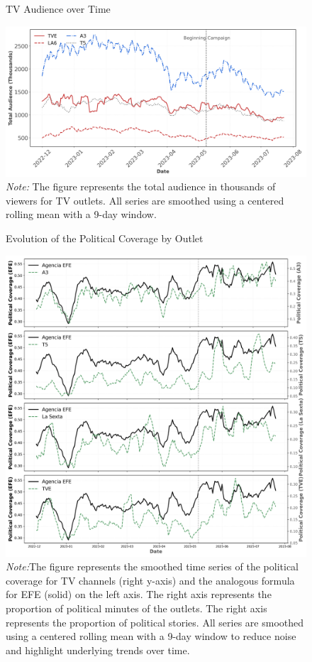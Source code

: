 \documentclass[12pt]{article}
\begin{document}
	
	
	
	\begin{figure}[!htb]
		\caption{TV Audience over Time}
		\centering
		\includegraphics[width=150mm]{figures/tv_audience_total}
		\caption*{\small \textit{Note:} The figure represents the total audience in thousands of viewers for TV outlets. All series are smoothed using a centered rolling mean with a 9-day window.}
		\label{fig:audience_total}
	\end{figure}
	
	

	
	
		\begin{figure}[!htb]
		\caption{Evolution of the Political Coverage by Outlet}
		\centering
		\includegraphics[width=150mm]{figures/tv_vs_efe_political_by_channel}
		\caption*{\small \textit{Note:}The figure represents the smoothed time series of the political coverage for TV channels (right y-axis) and the analogous formula for  EFE (solid) on the left axis. The right axis represents the proportion of political minutes of the outlets. The right axis represents the proportion of political stories.   All series are smoothed using a centered rolling mean with a 9-day window to reduce noise and highlight underlying trends over time.}
		\label{fig:political_by_channel}
	\end{figure}
	
\end{document}
